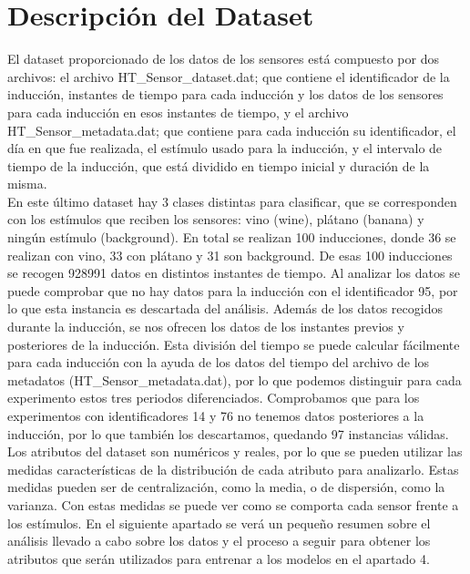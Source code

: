 \documentclass{esannV2}
\begin{document}
\section{Descripción del Dataset}
El dataset proporcionado de los datos de los sensores está compuesto por dos archivos: el archivo HT\_Sensor\_dataset.dat; que contiene el identificador de la inducción, instantes de tiempo para cada inducción y los datos de los sensores para cada inducción en esos instantes de tiempo, y el archivo HT\_Sensor\_metadata.dat; que contiene para cada inducción su identificador, el día en que fue realizada, el estímulo usado para la inducción, y el intervalo de tiempo de la inducción, que está dividido en tiempo inicial y duración de la misma. \\

En este último dataset hay 3 clases distintas para clasificar, que se corresponden con los estímulos que reciben los sensores:  vino (wine), plátano (banana) y ningún estímulo (background). En total se realizan 100 inducciones, donde  36 se realizan con vino, 33 con plátano y 31 son background. De esas 100 inducciones se recogen 928991 datos en distintos instantes de tiempo. Al analizar los datos se puede comprobar que no hay datos para la inducción con el identificador 95, por lo que esta instancia es descartada del análisis. Además de los datos recogidos durante la inducción, se nos ofrecen los datos de los instantes previos y posteriores de la inducción. Esta división del tiempo se puede calcular fácilmente para cada inducción con la ayuda de los datos del tiempo del archivo de los metadatos (HT\_Sensor\_metadata.dat), por lo que podemos distinguir para cada experimento estos tres periodos diferenciados. Comprobamos que para los experimentos con identificadores 14 y 76 no tenemos datos posteriores a la inducción, por lo que también los descartamos, quedando 97 instancias válidas. \\
Los atributos del dataset son numéricos y reales, por lo que se pueden utilizar las medidas características de la distribución de cada atributo para analizarlo. Estas medidas pueden ser de centralización, como la media, o de dispersión, como la varianza. Con estas medidas se puede ver como se comporta cada sensor frente a los estímulos. En el siguiente apartado se verá un pequeño resumen sobre el  análisis llevado a cabo sobre los datos y el proceso a seguir para obtener los atributos que serán utilizados para entrenar a los modelos en el apartado 4.
\end{document}
